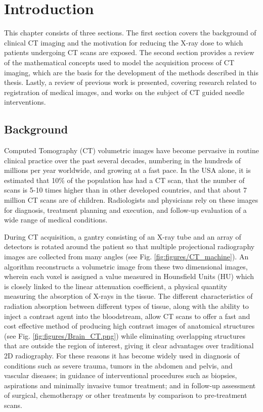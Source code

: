 \chapter{Introduction}

This chapter consists of three sections. The first section covers the background of clinical CT imaging and the motivation for reducing the X-ray dose to which patients undergoing CT scans are exposed. The second section provides a review of the mathematical concepts used to model the acquisition process of CT imaging, which are the basis for the development of the methods described in this thesis. Lastly, a review of previous work is presented, covering research related to registration of medical images, and works on the subject of CT guided needle interventions.

\section{Background}

Computed Tomography (CT) volumetric images have become pervasive in routine clinical practice over the past several decades, numbering in the hundreds of millions per year worldwide, and growing at a fast pace. 
In the USA alone, it is estimated that 10\% of the population has had a CT scan, that the number of scans is 5-10 times higher than in other developed countries, and that about 7 million CT scans are of children.
Radiologists and physicians rely on these images for diagnosis, treatment planning and execution, and follow-up evaluation of a wide range of medical conditions.

During CT acquisition, a gantry consisting of an X-ray tube and an array of detectors is rotated around the patient so that multiple projectional radiography images are collected from many angles (see Fig. \ref{fig:figures/CT_machine}).
An algorithm reconstructs a volumetric image from these two dimensional images, wherein each voxel is assigned a value measured in Hounsfield Units (HU) which is closely linked to the linear attenuation coefficient, a physical quantity measuring the absorption of X-rays in the tissue.
The different characteristics of radiation absorption between different types of tissue, along with the ability to inject a contrast agent into the bloodstream, allow CT scans to offer a fast and cost effective method of producing high contrast images of anatomical structures (see Fig. \ref{fig:figures/Brain_CT.png}) while eliminating overlapping structures that are outside the region of interest, giving it clear advantages over traditional 2D radiography.
For these reasons it has become widely used in diagnosis of conditions such as severe trauma, tumors in the abdomen and pelvis, and vascular diseases; in guidance of interventional procedures such as biopsies, aspirations and minimally invasive tumor treatment; and in follow-up assessment of surgical, chemotherapy or other treatments by comparison to pre-treatment scans.

